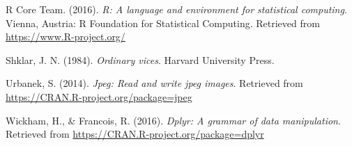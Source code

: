 \documentclass[english,pub]{apa6}
\theoremstyle{definition}
\theoremstyle{definition}
\theoremstyle{remark}
\begin{document}
\hypertarget{ref-R-base}{}
R Core Team. (2016). \emph{R: A language and environment for statistical
computing}. Vienna, Austria: R Foundation for Statistical Computing.
Retrieved from \url{https://www.R-project.org/}

\hypertarget{ref-shklar1984ordinary}{}
Shklar, J. N. (1984). \emph{Ordinary vices}. Harvard University Press.

\hypertarget{ref-R-jpeg}{}
Urbanek, S. (2014). \emph{Jpeg: Read and write jpeg images}. Retrieved
from \url{https://CRAN.R-project.org/package=jpeg}

\hypertarget{ref-R-dplyr}{}
Wickham, H., \& Francois, R. (2016). \emph{Dplyr: A grammar of data
manipulation}. Retrieved from
\url{https://CRAN.R-project.org/package=dplyr}
\end{document}
